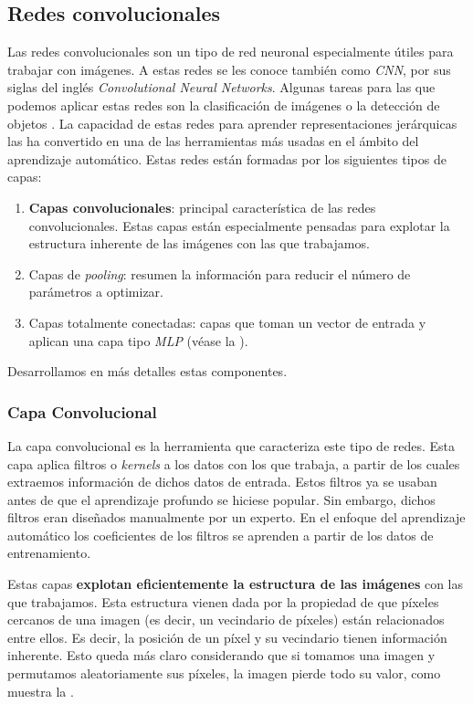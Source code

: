 \subsection{Redes convolucionales}

Las redes convolucionales son un tipo de red neuronal especialmente útiles para trabajar con imágenes. A estas redes se les conoce también como \textit{CNN}, por sus siglas del inglés \textit{Convolutional Neural Networks}. Algunas tareas para las que podemos aplicar estas redes son la clasificación de imágenes o la detección de objetos \cite{informatica:paper_definicion_cnn}. La capacidad de estas redes para aprender representaciones jerárquicas las ha convertido en una de las herramientas más usadas en el ámbito del aprendizaje automático. Estas redes están formadas por los siguientes tipos de capas:

\begin{enumerate}
    \item \textbf{Capas convolucionales}: principal característica de las redes convolucionales. Estas capas están especialmente pensadas para explotar la estructura inherente de las imágenes con las que trabajamos.
    \item Capas de \textit{pooling}: resumen la información para reducir el número de parámetros a optimizar.
    \item Capas totalmente conectadas: capas que toman un vector de entrada y aplican una capa tipo \textit{MLP} (véase la ).
\end{enumerate}

Desarrollamos en más detalles estas componentes.

\subsubsection{Capa Convolucional}

La capa convolucional es la herramienta que caracteriza este tipo de redes. Esta capa aplica filtros o \textit{kernels} a los datos con los que trabaja, a partir de los cuales extraemos información de dichos datos de entrada. Estos filtros ya se usaban antes de que el aprendizaje profundo se hiciese popular. Sin embargo, dichos filtros eran diseñados manualmente por un experto. En el enfoque del aprendizaje automático los coeficientes de los filtros se aprenden a partir de los datos de entrenamiento.

Estas capas \textbf{explotan eficientemente la estructura de las imágenes} con las que trabajamos. Esta estructura vienen dada por la propiedad de que píxeles cercanos de una imagen (es decir, un vecindario de píxeles) están relacionados entre ellos. Es decir, la posición de un píxel y su vecindario tienen información inherente. Esto queda más claro considerando que si tomamos una imagen y permutamos aleatoriamente sus píxeles, la imagen pierde todo su valor, como muestra la .

